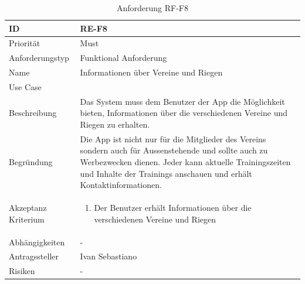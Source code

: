 \begin{table}[ht]
\centering
  \begin{tabular}{ l | p{8cm} }
	\hline
	\rowcolor{gray}
	ID 			&	\textbf{RE-F8}\\ \hline
	Priorität 		&	Must\\ \hline
	Anforderungstyp	&	Funktional Anforderung\\ \hline
	Name 			&	Informationen über Vereine und Riegen\\ \hline
	Use Case 		&	\nameref{table:use_case_6}\\ \hline
	Beschreibung 	&	Das System muss dem Benutzer der App die Möglichkeit bieten, Informationen über die verschiedenen Vereine und Riegen zu erhalten.\\ \hline
	Begründung 		&	Die App ist nicht nur für die Mitglieder des Vereins sondern auch für Aussenstehende und sollte auch zu Werbezwecken dienen. Jeder kann aktuelle Trainingszeiten und Inhalte der Trainings anschauen und erhält Kontaktinformationen.\\ \hline
	Akzeptanz Kriterium	&	\begin{enumerate}
					\item Der Benutzer erhält Informationen über die verschiedenen Vereine und Riegen
					\end{enumerate}
					\\ \hline
	Abhängigkeiten 	&	-\\ \hline
	Antragssteller 	&	Ivan Sebastiano\\ \hline
	Risiken	 	&	-
  \end{tabular}
   \caption{Anforderung RF-F8}\label{table:req_8}
\end{table}


